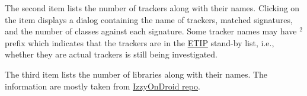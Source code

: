 The second item lists the number of trackers along with their names. Clicking on the item displays a
dialog containing the name of trackers, matched signatures, and the number of classes against each
signature. Some tracker names may have $^2$ prefix which indicates that the trackers are in the
\href{https://etip.exodus-privacy.eu.org}{ETIP} stand-by list, i.e., whether they are actual
trackers is still being investigated.

The third item lists the number of libraries along with their names. The information are mostly
taken from \href{https://gitlab.com/IzzyOnDroid/repo}{IzzyOnDroid repo}.


